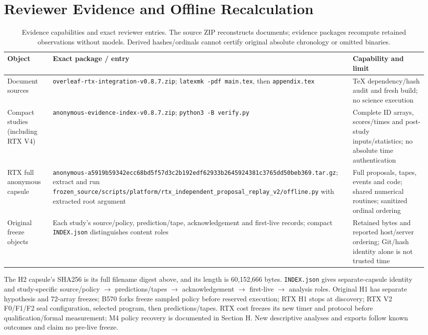 \section{Reviewer Evidence and Offline Recalculation}
\label{app:evidence}
\begin{table}[t]
\caption{Evidence capabilities and exact reviewer entries. The source ZIP reconstructs documents; evidence packages recompute retained observations without models. Derived hashes/ordinals cannot certify original absolute chronology or omitted binaries.}
\label{tab:evidenceentries}
\centering
\begin{tabular}{@{}p{1.55in}p{2.80in}p{1.9in}@{}}
\toprule
Object & Exact package / entry & Capability and limit \\
\midrule
Document sources & \nolinkurl{overleaf-rtx-integration-v0.8.7.zip}; \texttt{latexmk -pdf main.tex}, then \texttt{appendix.tex} & TeX dependency/hash audit and fresh build; no science execution \\
Compact studies (including RTX V4) & \nolinkurl{anonymous-evidence-index-v0.8.7.zip}; \texttt{python3 -B verify.py} & Complete ID arrays, scores/times and post-study inputs/statistics; no absolute time authentication \\
RTX full anonymous capsule & \nolinkurl{anonymous-a5919b59342ecc68bd5f57d3c2b192edf62933b2645924381c3765dd50beb369.tar.gz}; extract and run \nolinkurl{frozen_source/scripts/platform/rtx_independent_proposal_replay_v2/offline.py} with extracted root argument & Full proposals, tapes, events and code; shared numerical routines; sanitized ordinal ordering \\
Original freeze objects & Each study's source/policy, prediction/tape, acknowledgement and first-live records; compact \texttt{INDEX.json} distinguishes content roles & Retained bytes and reported host/server ordering; Git/hash identity alone is not trusted time \\
\bottomrule
\end{tabular}
\end{table}
The H2 capsule's SHA256 is its full filename digest above, and its length is 60,152,666 bytes. \texttt{INDEX.json} gives separate-capsule identity and study-specific source/policy $\to$ predictions/tapes $\to$ acknowledgement $\to$ first-live $\to$ analysis roles. Original H1 has separate hypothesis and 72-array freezes; B570 forks freeze sampled policy before reserved execution; RTX H1 stops at discovery; RTX V2 F0/F1/F2 seal configuration, selected program, then predictions/tapes. RTX cost freezes its new timer and protocol before qualification/formal measurement; M4 policy recovery is documented in Section H. New descriptive analyses and exports follow known outcomes and claim no pre-live freeze.

